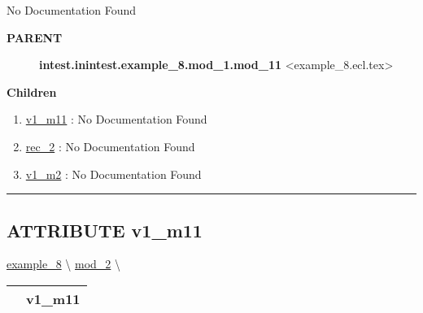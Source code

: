 \par





No Documentation Found










\par
\begin{description}
\item [\colorbox{tagtype}{\color{white} \textbf{\textsf{PARENT}}}] \textbf{intest.inintest.example\_8.mod\_1.mod\_11} <example\_8.ecl.tex>
\end{description}


\textbf{Children}
\begin{enumerate}
\item \hyperlink{ecldoc:intest.inintest.example_8.mod_1.mod_11.v1_m11}{v1\_m11}
: No Documentation Found
\item \hyperlink{ecldoc:intest.inintest.example_8.mod_2.rec_2}{rec\_2}
: No Documentation Found
\item \hyperlink{ecldoc:intest.inintest.example_8.mod_2.v1_m2}{v1\_m2}
: No Documentation Found
\end{enumerate}

\rule{\linewidth}{0.5pt}

\subsection*{\textsf{\colorbox{headtoc}{\color{white} ATTRIBUTE}
v1\_m11}}

\hypertarget{ecldoc:intest.inintest.example_8.mod_1.mod_11.v1_m11}{}
\hspace{0pt} \hyperlink{ecldoc:intest.inintest.example_8}{example_8} \textbackslash 
\hspace{0pt} \hyperlink{ecldoc:intest.inintest.example_8.mod_2}{mod_2} \textbackslash 

{\renewcommand{\arraystretch}{1.5}
\begin{tabularx}{\textwidth}{|>{\raggedright\arraybackslash}l|X|}
\hline
\hspace{0pt}\mytexttt{\color{red} } & \textbf{v1\_m11} \\
\hline
\end{tabularx}
}

\par





